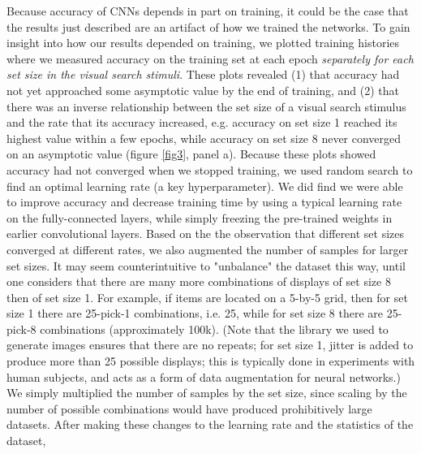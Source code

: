 \documentclass[10pt,letterpaper]{article}
\begin{document}
Because accuracy of CNNs depends in part on training, it could be the case that 
the results just described are an artifact of how we trained the networks. 
To gain insight into how our results depended on training, 
we plotted training histories where we measured accuracy on the training set 
at each epoch \emph{separately for each set size in the visual search stimuli}.
These plots revealed (1) that accuracy had not yet approached some asymptotic 
value by the end of training, and (2) that there was an inverse relationship between 
the set size of a visual search stimulus and the rate that its accuracy increased, 
e.g. accuracy on set size 1 reached its highest value within a few epochs, while accuracy on 
set size 8 never converged on an asymptotic value (figure \ref{fig3}, panel a).
Because these plots showed accuracy had not converged when we stopped training, we 
used random search to find an optimal learning rate (a key hyperparameter).
We did find we were able to improve accuracy and decrease training time by 
using a typical learning rate on the fully-connected layers, while simply 
freezing the pre-trained weights in earlier convolutional layers.
Based on the the observation that different set sizes converged at different rates, we 
also augmented the number of samples for larger set sizes.
It may seem counterintuitive to "unbalance" the dataset this way, until one considers 
that there are many more combinations of displays of set size 8 then of set size 1. 
For example, if items are located on a 5-by-5 grid, then for set size 1 there are 25-pick-1
combinations, i.e. 25,  while for set size 8 there are 25-pick-8 combinations (approximately 100k).
(Note that the library we used to generate images ensures that there are no repeats; for set size 1, 
jitter is added to produce more than 25 possible displays; this is typically done in experiments 
with human subjects, and acts as a form of data augmentation for neural networks.)
We simply multiplied the number of samples by the set size, since scaling 
by the number of possible combinations would have produced prohibitively large datasets.
After making these changes to the learning rate and the statistics of the dataset, 
\end{document}
